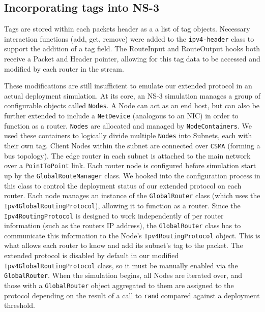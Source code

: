 \documentclass[12pt]{article} %
\newcommand{\prettycode}[1]
{\lstinline[basicstyle=\ttfamily]{#1}}
\begin{document}
\subsection{Incorporating tags into NS-3}

Tags are stored within each packets header as a a list of tag objects. Necessary interaction functions (add, get, remove) were added to the \prettycode{ipv4-header} class to support the addition of a tag field. The RouteInput and RouteOutput hooks both receive a Packet and Header pointer, allowing for this tag data to be accessed and modified by each router in the stream. 

These modifications are still insufficient to emulate our extended protocol in an actual deployment simulation. At its core, an NS-3 simulation manages a group of configurable objects called \prettycode{Nodes}. A Node can act as an end host, but can also be further extended to include a \prettycode{NetDevice} (analogous to an NIC) in order to function as a router. \prettycode{Nodes} are allocated and managed by \prettycode{NodeContainers}. We used these containers to logically divide multiple \prettycode{Nodes} into Subnets, each with their own tag. Client Nodes within the subnet are connected over \prettycode{CSMA} (forming a bus topology). The edge router in each subnet is attached to the main network over a \prettycode{PointToPoint} link. Each router node is configured before simulation start up by the \prettycode{GlobalRouteManager} class. We hooked into the configuration process in this class to control the deployment status of our extended protocol on each router. Each node manages an instance of the \prettycode{GlobalRouter} class (which uses the \prettycode{Ipv4GlobalRoutingProtocol}), allowing it to function as a router. Since the \prettycode{Ipv4RoutingProtocol} is designed to work independently of per router information (such as the routers IP address), the \prettycode{GlobalRouter} class has to communicate this information to the Node's \prettycode{Ipv4RoutingProtocol} object. This is what allows each router to know and add its subnet's tag to the packet. The extended protocol is disabled by default in our modified \prettycode{Ipv4GlobalRoutingProtocol} class, so it must be manually enabled via the \prettycode{GlobalRouter}. When the simulation begins, all Nodes are iterated over, and those with a \prettycode{GlobalRouter} object aggregated to them are assigned to the protocol depending on the result of a call to \prettycode{rand} compared against a deployment threshold.
\end{document}
